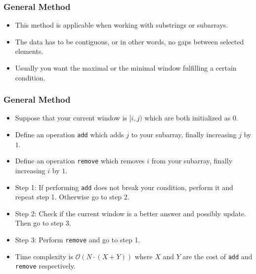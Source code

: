 \documentclass{beamer}
\begin{document}
\begin{frame}
    \frametitle{General Method}
    \begin{itemize}
        \item<1->  This method is applicable when working with substrings or subarrays.
        \item<2->  The data has to be contiguous, or in other words, no gaps between selected elements.
        \item<3->  Usually you want the maximal or the minimal window fulfilling a certain condition.
    \end{itemize}
\end{frame}

\begin{frame}
    \frametitle{General Method}
    \begin{itemize}
        \item<1->  Suppose that your current window is $[i, j)$ which are both initialized as $0$.
        \item<2->  Define an operation \texttt{add} which adds $j$ to your subarray, finally increasing $j$ by $1$.
        \item<3->  Define an operation \texttt{remove} which removes $i$ from your subarray, finally increasing $i$ by $1$.
        \item<4->  Step 1: If performing \texttt{add} does not break your condition, perform it and repeat step 1. Otherwise go to step 2.
        \item<5->  Step 2: Check if the current window is a better answer and possibly update. Then go to step 3.
        \item<6->  Step 3: Perform \texttt{remove} and go to step 1.
        \item<7-> Time complexity is $\mathcal{O}(N \cdot (X + Y))$ where $X$ and $Y$ are the cost of \texttt{add} and \texttt{remove} respectively.
    \end{itemize}
\end{frame}
\end{document}
